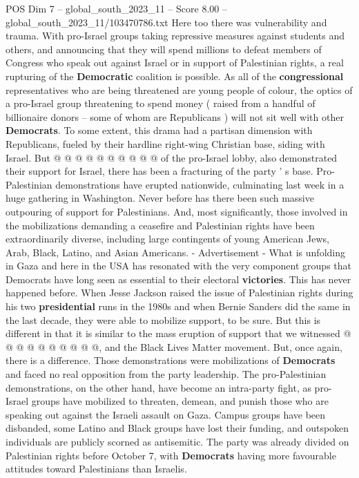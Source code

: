 \begin{textsample}{POS Dim 7 – global\_south\_2023\_11 – Score 8.00 – global\_south\_2023\_11/103470786.txt}
Here too there was vulnerability and trauma.
With pro-Israel groups taking repressive measures against students and others, and announcing that they will spend millions to defeat members of Congress who speak out against Israel or in support of Palestinian rights, a real rupturing of the \textbf{Democratic} coalition is possible.
As all of the \textbf{congressional} representatives who are being threatened are young people of colour, the optics of a pro-Israel group threatening to spend money ( raised from a handful of billionaire donors -- some of whom are Republicans ) will not sit well with other \textbf{Democrats}.
To some extent, this drama had a partisan dimension with Republicans, fueled by their hardline right-wing Christian base, siding with Israel.
But @ @ @ @ @ @ @ @ @ @ of the pro-Israel lobby, also demonstrated their support for Israel, there has been a fracturing of the party ' s base.
Pro-Palestinian demonstrations have erupted nationwide, culminating last week in a huge gathering in Washington.
Never before has there been such massive outpouring of support for Palestinians.
And, most significantly, those involved in the mobilizations demanding a ceasefire and Palestinian rights have been extraordinarily diverse, including large contingents of young American Jews, Arab, Black, Latino, and Asian Americans. - Advertisement - What is unfolding in Gaza and here in the USA has resonated with the very component groups that Democrats have long seen as essential to their electoral \textbf{victories}.
This has never happened before.
When Jesse Jackson raised the issue of Palestinian rights during his two \textbf{presidential} runs in the 1980s and when Bernie Sanders did the same in the last decade, they were able to mobilize support, to be sure.
But this is different in that it is similar to the mass eruption of support that we witnessed @ @ @ @ @ @ @ @ @ @, and the Black Lives Matter movement.
But, once again, there is a difference.
Those demonstrations were mobilizations of \textbf{Democrats} and faced no real opposition from the party leadership.
The pro-Palestinian demonstrations, on the other hand, have become an intra-party fight, as pro-Israel groups have mobilized to threaten, demean, and punish those who are speaking out against the Israeli assault on Gaza.
Campus groups have been disbanded, some Latino and Black groups have lost their funding, and outspoken individuals are publicly scorned as antisemitic.
The party was already divided on Palestinian rights before October 7, with \textbf{Democrats} having more favourable attitudes toward Palestinians than Israelis.

\end{textsample}
